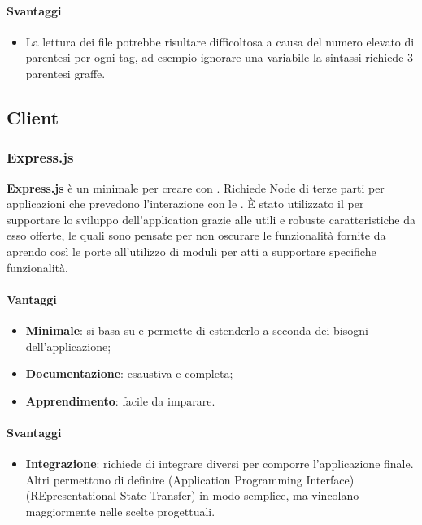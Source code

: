 \paragraph{Svantaggi} 
\begin{itemize}
\item La lettura dei file potrebbe risultare difficoltosa a causa del numero elevato di parentesi per ogni tag, ad esempio ignorare una variabile la sintassi richiede 3 parentesi graffe. 
\end{itemize}
	\subsection{Client}
	\subsubsection{Express.js}
\textbf{Express.js} è un  minimale per creare   con . Richiede  Node di terze parti per applicazioni che prevedono l'interazione con le .
È stato utilizzato il   per supportare lo sviluppo dell'application  grazie alle utili e robuste caratteristiche da esso offerte, le quali sono pensate per non oscurare le funzionalità fornite da  aprendo così le porte all'utilizzo di moduli per  atti a supportare specifiche funzionalità.

\paragraph{Vantaggi}
\begin{itemize}
\item \textbf{Minimale}: si basa su  e permette di estenderlo a seconda dei bisogni
dell’applicazione;
\item\textbf{Documentazione}: esaustiva e completa;
\item\textbf{Apprendimento}: facile da imparare.
\end{itemize}

\paragraph{Svantaggi}
\begin{itemize}
\item \textbf{Integrazione}: richiede di integrare  diversi per comporre l’applicazione
finale. Altri  permettono di definire  (Application Programming
Interface)  (REpresentational State Transfer) in modo semplice, ma vincolano
maggiormente nelle scelte progettuali.
\end{itemize}


